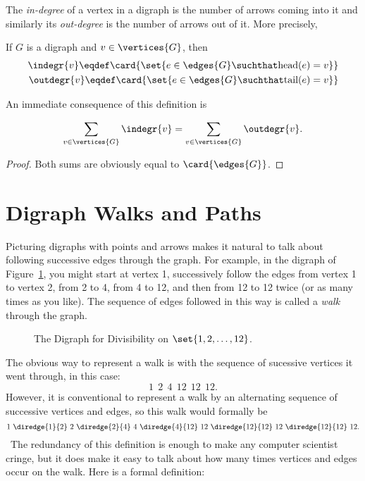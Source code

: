 The \emph{in-degree} of a vertex in a digraph is the number of arrows
coming into it and similarly its \emph{out-degree} is the number of
arrows out of it.  More precisely,
\begin{definition}\label{digraph-degree}
If $G$ is a digraph and $v \in \vertices{G}$, then
\begin{align*}
\indegr{v} \eqdef \card{\set{ e \in \edges{G} \suchthat \text{head}(e) = v}}\\
\outdegr{v} \eqdef \card{\set{ e \in \edges{G} \suchthat \text{tail}(e) = v}}\\
\end{align*}
\end{definition}

An immediate consequence of this definition is
\begin{lemma}\label{digraph-handshake}
\[
\sum_{v \in \vertices{G}} \indegr{v} = \sum_{v \in \vertices{G}} \outdegr{v}.
\]
\end{lemma}
\begin{proof}
Both sums are obviously equal to $\card{\edges{G}}$.
\end{proof}

\section{Digraph Walks and Paths}

Picturing digraphs with points and arrows makes it natural to talk
about following successive edges through the graph.  For example, in
the digraph of Figure~\ref{fig:divisibility-digraph}, you might start
at vertex 1, successively follow the edges from vertex 1 to vertex 2,
from 2 to 4, from 4 to 12, and then from 12 to 12 twice (or as many
times as you like).  The sequence of edges followed in this way is
called a \emph{walk} through the graph.

\begin{figure}
\caption{The Digraph for Divisibility on $\set{1,2,\dots,12}$.}
\label{fig:divisibility-digraph}
\end{figure}

The obvious way to represent a walk is with the sequence of sucessive
vertices it went through, in this case:
\[
1\ \:2\ \:4\ \:12\ \:12\ \:12.
\]
However, it is conventional to represent a walk by an alternating
sequence of successive vertices and edges, so this walk would formally
be
\begin{equation}\label{walk12412}
1\ \diredge{1}{2}\  2\  \diredge{2}{4}\  4\ \diredge{4}{12}\  12\ 
\diredge{12}{12}\  12\ \diredge{12}{12}\  12.
\end{equation}\
The redundancy of this definition is enough to make any computer
scientist cringe, but it does make it easy to talk about how many
times vertices and edges occur on the walk.  Here is a formal
definition:

